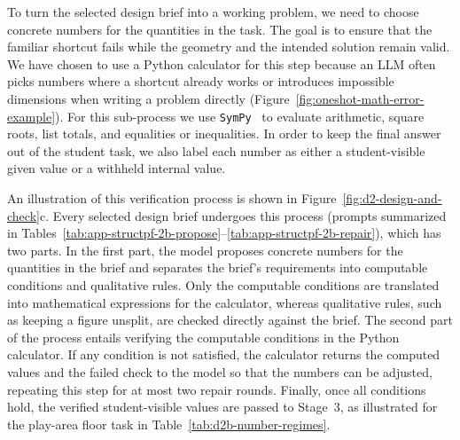 To turn the selected design brief into a working problem, we need to choose concrete numbers for the quantities in the task. The goal is to ensure that the familiar shortcut fails while the geometry and the intended solution remain valid. We have chosen to use a Python calculator for this step because an LLM often picks numbers where a shortcut already works or introduces impossible dimensions when writing a problem directly (Figure~\ref{fig:oneshot-math-error-example}). For this sub-process we use \texttt{SymPy}~\cite{meurer2017sympy} to evaluate arithmetic, square roots, list totals, and equalities or inequalities. In order to keep the final answer out of the student task, we also label each number as either a student-visible given value or a withheld internal value.

An illustration of this verification process is shown in Figure~\ref{fig:d2-design-and-check}c. Every selected design brief undergoes this process (prompts summarized in Tables~\ref{tab:app-structpf-2b-propose}--\ref{tab:app-structpf-2b-repair}), which has two parts. In the first part, the model proposes concrete numbers for the quantities in the brief and separates the brief's requirements into computable conditions and qualitative rules. Only the computable conditions are translated into mathematical expressions for the calculator, whereas qualitative rules, such as keeping a figure unsplit, are checked directly against the brief. The second part of the process entails verifying the computable conditions in the Python calculator. If any condition is not satisfied, the calculator returns the computed values and the failed check to the model so that the numbers can be adjusted, repeating this step for at most two repair rounds. Finally, once all conditions hold, the verified student-visible values are passed to Stage~3, as illustrated for the play-area floor task in Table~\ref{tab:d2b-number-regimes}.

